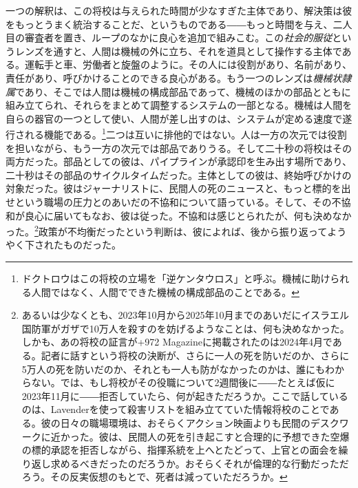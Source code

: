 一つの解釈は、この将校は与えられた時間が少なすぎた主体であり、解決策は彼をもっとうまく統治することだ、というものである――もっと時間を与え、二人目の審査者を置き、ループのなかに良心を追加で組みこむ。この\emph{社会的服従}というレンズを通すと、人間は機械の外に立ち、それを道具として操作する主体である。運転手と車、労働者と旋盤のように。その人には役割があり、名前があり、責任があり、呼びかけることのできる良心がある。もう一つのレンズは\emph{機械状隷属}であり、そこでは人間は機械の構成部品であって、機械のほかの部品とともに組み立てられ、それらをまとめて調整するシステムの一部となる。機械は人間を自らの器官の一つとして使い、人間が差し出すのは、システムが定める速度で遂行される機能である。\footnote{ドクトロウはこの将校の立場を「逆ケンタウロス」と呼ぶ。機械に助けられる人間ではなく、人間でできた機械の構成部品のことである\autocite{doctorow2026reversecentaur}。}二つは互いに排他的ではない。人は一方の次元では役割を担いながら、もう一方の次元では部品でありうる\autocite[第13プラトー「The Apparatus of Capture」。隷属があるのは、人間そのものが、より上位の統一体の統制と指揮のもとで、人間同士やほかの事物とともに構成する機械の構成部品となっているときであり、服従があるのは、上位の統一体が人間を、新たな外的対象――それは動物でも、道具でも、機械でさえありうる――に結びつけられた主体として構成するときである]{deleuze1987plateaus}。そして二十秒の将校はその両方だった。部品としての彼は、パイプラインが承認印を生み出す場所であり、二十秒はその部品のサイクルタイムだった。主体としての彼は、終始呼びかけの対象だった。彼はジャーナリストに、民間人の死のニュースと、もっと標的を出せという職場の圧力とのあいだの不協和について語っている。そして、その不協和が良心に届いてもなお、彼は従った。不協和は感じとられたが、何も決めなかった。\footnote{あるいは少なくとも、2023年10月から2025年10月までのあいだにイスラエル国防軍がガザで10万人を殺すのを妨げるようなことは、何も決めなかった\autocite{gomezugarte2025uncertainty,acosta2026gaza,economist2025gaza}。しかも、あの将校の証言が+972 Magazineに掲載されたのは2024年4月である。記者に話すという将校の決断が、さらに一人の死を防いだのか、さらに5万人の死を防いだのか、それとも一人も防がなかったのかは、誰にもわからない。では、もし将校がその役職について2週間後に――たとえば仮に2023年11月に――拒否していたら、何が起きただろうか。ここで話しているのは、Lavenderを使って殺害リストを組み立てていた情報将校のことである。彼の日々の職場環境は、おそらくアクション映画よりも民間のデスクワークに近かった。彼は、民間人の死を引き起こすと合理的に予想できた空爆の標的承認を拒否しながら、指揮系統を上へとたどって、上官との面会を繰り返し求めるべきだったのだろうか。おそらくそれが倫理的な行動だっただろう。その反実仮想のもとで、死者は減っていただろうか。}政策が不均衡だったという判断は、彼によれば、後から振り返ってようやく下されたものだった。

